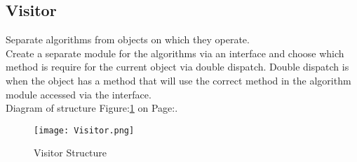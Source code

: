 \documentclass[11pt]{scrartcl} %
\begin{document}
\subsection{Visitor}

Separate algorithms from objects on which they operate.\\

Create a separate module for the algorithms via an interface and choose which method is require for the current object via double dispatch.
Double dispatch is when the object has a method that will use the correct method in the algorithm module accessed via
the interface.\\

Diagram of structure Figure:\ref{Visitor Structure} on Page:\pageref{Visitor Structure}.

\begin{figure}[h] %
	\centering
	\texttt{[image: Visitor.png]} %
	\caption{Visitor Structure}
	\label{Visitor Structure}
\end{figure}






\end{document}
